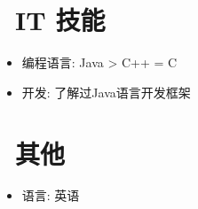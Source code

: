 \documentclass{resume}
\begin{document}

\section{\faCogs\ IT 技能}
\begin{itemize}[parsep=0.5ex]
  \item 编程语言: Java > C++ = C 
  \item 开发: 了解过Java语言开发框架
\end{itemize}

\section{\faInfo\ 其他}
\begin{itemize}[parsep=0.5ex]
  \item 语言: 英语 
\end{itemize}

%
%
\end{document}
